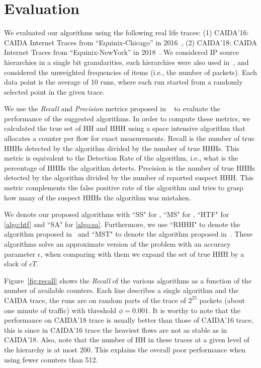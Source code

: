 \section{Evaluation}
We evaluated our algorithms using the following real life traces: (1) CAIDA'16: CAIDA Internet Traces from ``Equinix-Chicago'' in 2016~\cite{CAIDA2016}, (2) CAIDA'18: CAIDA Internet Traces from ``Equinix-NewYork'' in 2018~\cite{CAIDA2018}. We considered IP source hierarchies in a single bit granularities, such hierarchies were also used in~\cite{ben2017constant, SpaceSaving}, and considered the unweighted frequencies of items (i.e., the number of packets). Each data point is the average of 10 runs, where each run started from a randomly selected point in the given trace.

We use the \textit{Recall} and \textit{Precision} metrics proposed in ~\cite{ffMetrics} to evaluate the performance of the suggested algorithms. In order to compute these metrics, we calculated the true set of HH and HHH using a space intensive algorithm that allocates a counter per flow for exact measurements.
Recall is the number of true HHHs detected by the algorithm divided by the number of true HHHs. This metric is equivalent to the Detection Rate of the algorithm, i.e., what is the percentage of HHHs the algorithm detects.
Precision is the number of true HHHs detected by the algorithm divided by the number of reported suspect HHH. This metric complements the false positive rate of the algorithm and tries to grasp how many of the suspect HHHs the algorithm was mistaken.

We denote our proposed algorithms with ``SS" for \simpleAlgo, ``MS" for \multipleAlgo, ``HTF" for \ref{algo:htf} and ``SA" for \ref{algo:sa}. Furthermore, we use ``RHHH" to denote the algorithm proposed in~\cite{ben2017constant} and ``MST" to denote the algorithm proposed in~\cite{SpaceSaving}. These algorithms solve an approximate version of the problem with an accuracy parameter $\epsilon$, when comparing with them we expand the set of true HHH by a slack of $\epsilon T$.



Figure~\ref{fig:recall} shows the \textit{Recall} of the various algorithms as a function of the number of available counters. Each line describes a single algorithm and the CAIDA trace, the runs are on random parts of the trace of $2^{25}$ packets (about one minute of traffic) with threshold $\phi=0.001$. It is worthy to note that the performance on CAIDA'18 trace is usually better than those of CAIDA'16 trace, this is since in CAIDA'16 trace the heaviest flows are not as stable as in CAIDA'18. Also, note that the number of HH in these traces at a given level of the hierarchy is at most 200. This explains the overall poor performance when using fewer counters than 512.

